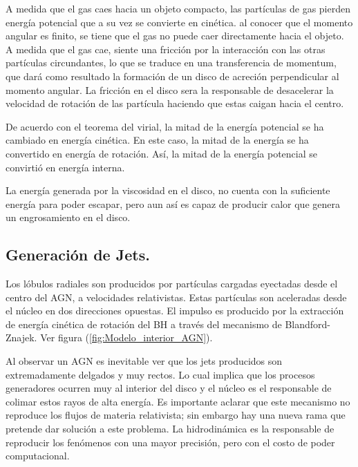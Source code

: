 A medida que el gas caes hacia un objeto compacto, las partículas de gas pierden energía potencial que a su vez se convierte en cinética. al conocer que el momento angular es finito, se tiene que el gas no puede caer directamente hacia el objeto. A medida que el gas cae, siente una fricción por la interacción con las otras partículas circundantes, lo que se traduce en una transferencia de momentum, que dará como resultado la formación de un disco de acreción perpendicular al momento angular. La fricción en el disco sera la responsable de desacelerar la velocidad de rotación de las partícula haciendo que estas caigan hacia el centro. 

De acuerdo con el teorema del virial, la mitad de la energía potencial se ha cambiado en energía cinética. En este caso, la mitad de la energía se ha convertido en energía de rotación. Así, la mitad de la energía potencial se convirtió en energía interna. 

La energía generada por la viscosidad en el disco, no cuenta con la suficiente energía para poder escapar, pero aun así es capaz de producir calor que genera un engrosamiento en el disco.


	\subsection{Generación de Jets.}
	\label{subsec:Generation_Jets}

Los lóbulos radiales son producidos por partículas cargadas eyectadas desde el centro del AGN, a velocidades relativistas. Estas partículas son aceleradas desde el núcleo en dos direcciones opuestas. El impulso es producido por la extracción de energía cinética de rotación del BH a través del mecanismo de Blandford- Znajek. Ver figura (\ref{fig:Modelo_interior_AGN}).%

Al observar un AGN es inevitable ver que los jets producidos son extremadamente delgados y muy rectos. Lo cual implica  que los procesos generadores ocurren muy al interior del disco y el núcleo es el responsable de colimar estos rayos de alta energía. Es importante aclarar que este mecanismo no reproduce los flujos de materia relativista; sin embargo hay una nueva rama que pretende dar solución a este problema. La hidrodinámica es la responsable de reproducir los fenómenos con una mayor precisión, pero con el costo de poder computacional.

